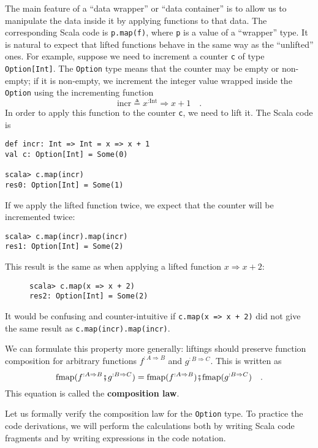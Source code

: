 The main feature of a ``data wrapper'' or ``data container'' is
to allow us to manipulate the data inside it by applying functions
to that data. The corresponding Scala code is \lstinline!p.map(f)!,
where \lstinline!p! is a value of a ``wrapper'' type. It is natural
to expect that lifted functions behave in the same way as the ``unlifted''
ones. For example, suppose we need to increment a counter \lstinline!c!
of type \lstinline!Option[Int]!. The \lstinline!Option! type means
that the counter may be empty or non-empty; if it is non-empty, we
increment the integer value wrapped inside the \lstinline!Option!
using the incrementing function
\[
\text{incr}\triangleq x^{:\text{Int}}\Rightarrow x+1\quad.
\]
In order to apply this function to the counter \lstinline!c!, we
need to lift it. The Scala code is
\begin{lstlisting}
def incr: Int => Int = x => x + 1
val c: Option[Int] = Some(0)

scala> c.map(incr)
res0: Option[Int] = Some(1) 
\end{lstlisting}
If we apply the lifted function twice, we expect that the counter
will be incremented twice:
\begin{lstlisting}
scala> c.map(incr).map(incr)
res1: Option[Int] = Some(2)
\end{lstlisting}
This result is the same as when applying a lifted function $x\Rightarrow x+2$:

\begin{wrapfigure}{l}{0.3\columnwidth}%
\vspace{-0.8\baselineskip}
\begin{lstlisting}
scala> c.map(x => x + 2)
res2: Option[Int] = Some(2)
\end{lstlisting}
\vspace{-1.2\baselineskip}
\end{wrapfigure}%

\noindent It would be confusing and counter-intuitive if \lstinline!c.map(x => x + 2)!
did not give the same result as \lstinline!c.map(incr).map(incr)!. 

We can formulate this property more generally: liftings should preserve
function composition for arbitrary functions $f^{:A\Rightarrow B}$
and $g^{:B\Rightarrow C}$. This is written as
\[
\text{fmap}(f^{:A\Rightarrow B}\bef g^{:B\Rightarrow C})=\text{fmap}(f^{:A\Rightarrow B})\bef\text{fmap}(g^{:B\Rightarrow C})\quad.
\]
This equation is called the \textbf{composition law}.

Let us formally verify the composition law for the \lstinline!Option!
type. To practice the code derivations, we will perform the calculations
both by writing Scala code fragments and by writing expressions in
the code notation.

